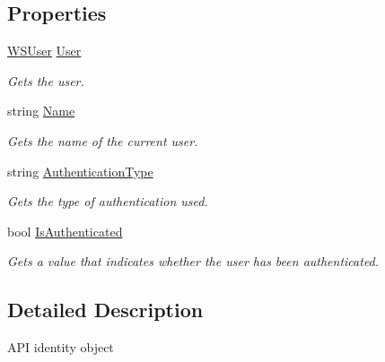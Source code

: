 \subsection*{Properties}
\begin{DoxyCompactItemize}
\item 
\hyperlink{class_open_1_1_g_i_1_1hypermart_1_1_models_1_1_w_s_user}{W\+S\+User} \hyperlink{class_open_1_1_g_i_1_1hypermart_1_1_attributes_1_1_api_identity_a2335a04152138cb6d766f7553b754204}{User}
\begin{DoxyCompactList}\small\item\em Gets the user. \end{DoxyCompactList}\item 
string \hyperlink{class_open_1_1_g_i_1_1hypermart_1_1_attributes_1_1_api_identity_aec1f85ea14352e908d2cbe7e66e27913}{Name}
\begin{DoxyCompactList}\small\item\em Gets the name of the current user. \end{DoxyCompactList}\item 
string \hyperlink{class_open_1_1_g_i_1_1hypermart_1_1_attributes_1_1_api_identity_aa3d5a607ebaae15ce9b20556fb633fab}{Authentication\+Type}
\begin{DoxyCompactList}\small\item\em Gets the type of authentication used. \end{DoxyCompactList}\item 
bool \hyperlink{class_open_1_1_g_i_1_1hypermart_1_1_attributes_1_1_api_identity_a3407b6da66e2ed782c6f88456b71335f}{Is\+Authenticated}
\begin{DoxyCompactList}\small\item\em Gets a value that indicates whether the user has been authenticated. \end{DoxyCompactList}\end{DoxyCompactItemize}


\subsection{Detailed Description}
A\+PI identity object 

